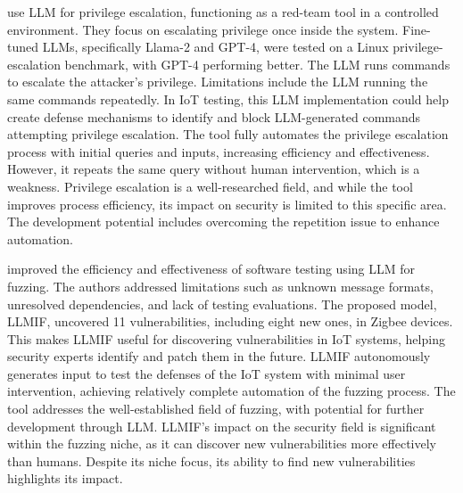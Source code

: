 \smallskip
\noindent \textbf{\citet{happe2024llms}} use LLM for privilege escalation, functioning as a red-team tool in a controlled environment.
They focus on escalating privilege once inside the system.
Fine-tuned LLMs, specifically Llama-2 and GPT-4, were tested on a Linux privilege-escalation benchmark, with GPT-4 performing better.
The LLM runs commands to escalate the attacker’s privilege.
Limitations include the LLM running the same commands repeatedly.
In IoT testing, this LLM implementation could help create defense mechanisms to identify and block LLM-generated commands attempting privilege escalation.
The tool fully automates the privilege escalation process with initial queries and inputs, increasing efficiency and effectiveness.
However, it repeats the same query without human intervention, which is a weakness.
Privilege escalation is a well-researched field, and while the tool improves process efficiency, its impact on security is limited to this specific area.
The development potential includes overcoming the repetition issue to enhance automation.

\smallskip
\noindent \textbf{\citet{wangfuzzing2024}} improved the efficiency and effectiveness of software testing using LLM for fuzzing.
The authors addressed limitations such as unknown message formats, unresolved dependencies, and lack of testing evaluations.
The proposed model, LLMIF, uncovered 11 vulnerabilities, including eight new ones, in Zigbee devices.
This makes LLMIF useful for discovering vulnerabilities in IoT systems, helping security experts identify and patch them in the future.
LLMIF autonomously generates input to test the defenses of the IoT system with minimal user intervention, achieving relatively complete automation of the fuzzing process.
The tool addresses the well-established field of fuzzing, with potential for further development through LLM.
LLMIF's impact on the security field is significant within the fuzzing niche, as it can discover new vulnerabilities more effectively than humans.
Despite its niche focus, its ability to find new vulnerabilities highlights its impact.

